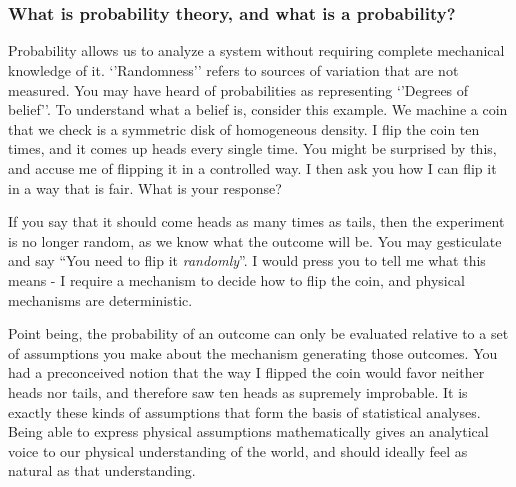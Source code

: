 \documentclass[11pt,a4paper,article]{memoir} %
\begin{document}

\newpage



\newpage
\appendix
\chapter{}
\subsection{What is probability theory, and what is a probability?}
Probability allows us to analyze a system without requiring complete mechanical knowledge of it. `'Randomness'' refers to sources of variation that are not measured. You may have heard of probabilities as representing `'Degrees of belief''. To understand what a belief is, consider this example. We machine a coin that we check is a symmetric disk of homogeneous density. I flip the coin ten times, and it comes up heads every single time. You might be surprised by this, and accuse me of flipping it in a controlled way. I then ask you how I can flip it in a way that is fair. What is your response?
\par
If you say that it should come heads as many times as tails, then the experiment is no longer random, as we know what the outcome will be. You may gesticulate and say ``You need to flip it \emph{randomly}''. I would press you to tell me what this means - I require a mechanism to decide how to flip the coin, and physical mechanisms are deterministic.
\par
Point being, the probability of an outcome can only be evaluated relative to a set of assumptions you make about the mechanism generating those outcomes. You had a preconceived notion that the way I flipped the coin would favor neither heads nor tails, and therefore saw ten heads as supremely improbable. It is exactly these kinds of assumptions that form the basis of statistical analyses. Being able to express physical assumptions mathematically gives an analytical voice to our physical understanding of the world, and should ideally feel as natural as that understanding.
\newpage
\end{document}
